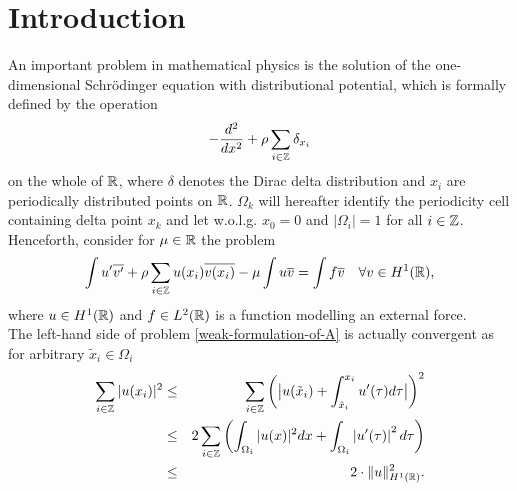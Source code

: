 \chapter{Introduction}

An important problem in mathematical physics is the solution of the one-dimensional Schrödinger equation with distributional potential, which is formally defined by the operation
\begin{equation}
	- \frac{d^{2}}{dx^{2}} + \rho \sum_{i \in \mathbb{Z}} \delta_{x_{i}} \label{the-operator-A-formally}
\end{equation}
on the whole of $\mathbb{R}$, where $\delta$ denotes the Dirac delta distribution and $x_{i}$ are periodically distributed points on $\mathbb{R}$. $\Omega_{k}$ will hereafter identify the periodicity cell containing delta point $x_{k}$ and let w.o.l.g. $x_{0} = 0$ and $|\Omega_{i}| = 1$ for all $i \in \mathbb{Z}$. \\

Henceforth, consider for $\mu \in \mathbb{R}$ the problem
\begin{equation}
	\int u' \overline{v'} + \rho \sum_{i \in \mathbb{Z}} u(x_{i}) \overline{v(x_{i})} - \mu \int u \overline{v} = \int f \overline{v} \quad \forall v \in H^{1}(\mathbb{R}), \label{weak-formulation-of-A}
\end{equation}	
where $u \in H^{1}(\mathbb{R})$ and $f \in L^{2}(\mathbb{R})$ is a function modelling an external force. \\	
The left-hand side of problem \eqref{weak-formulation-of-A} is actually convergent as for arbitrary $\tilde{x}_{i} \in \Omega_{i}$
\begin{eqnarray}
	\sum_{i \in \mathbb{Z}} |u(x_{i})|^{2} & \leq & \sum_{i \in \mathbb{Z}} \left( \big| u(\tilde{x}_{i}) + \int_{\tilde{x}_{i}}^{x_{i}} u'( \tau ) d\tau \big| \right)^{2} \notag \\
		 & \leq & 2 \sum_{i \in \mathbb{Z}} \left( \int_{\Omega_{i}} |u( x )|^{2} dx +  \int_{\Omega_{i}} \left| u'(\tau) \right|^{2} d\tau \right) \notag \\
		 & \leq & 2 \cdot \| u \|^{2}_{H^{1}(\mathbb{R})}. \label{estimation-for-potential}
\end{eqnarray}